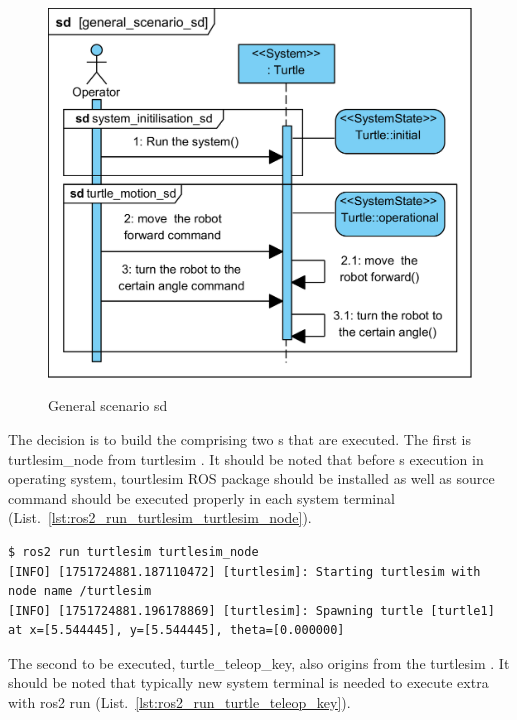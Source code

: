 \documentclass[11pt,oneside,a4paper]{report}
\begin{document}
\begin{figure}[H]
	\centering
	\begin{center}
		{\includegraphics[scale=1.0]{diagrams/general_scenario_sd.png}}
	\end{center}
	\caption{General scenario sd}
	\label{fig:general_scenario_sd}
\end{figure}


The decision is to build the \stSystem{} comprising two \stNode{}s that are executed.   The first is \textsf{turtlesim\_node} \stNode{} from \textsf{turtlesim} \stPackage{}. It should be noted that before \stNode{}s execution in operating system, tourtlesim ROS package should be installed as well as source command should be executed properly in each system terminal (List.~\ref{lst:ros2_run_turtlesim_turtlesim_node}).

\begin{lstlisting}[style=terminal,label={lst:ros2_run_turtlesim_turtlesim_node},caption={ros2 run turtlesim turtlesim\_node}]
$ ros2 run turtlesim turtlesim_node
[INFO] [1751724881.187110472] [turtlesim]: Starting turtlesim with node name /turtlesim
[INFO] [1751724881.196178869] [turtlesim]: Spawning turtle [turtle1] at x=[5.544445], y=[5.544445], theta=[0.000000]
\end{lstlisting}

The second \stNode{} to be executed, \textsf{turtle\_teleop\_key}, also origins from the \textsf{turtlesim} \stPackage{}. It should be noted that typically new system terminal is needed to execute extra \stNode{} with \textsf{ros2 run} \stCLTool{} (List.~\ref{lst:ros2_run_turtle_teleop_key}).
\end{document}
